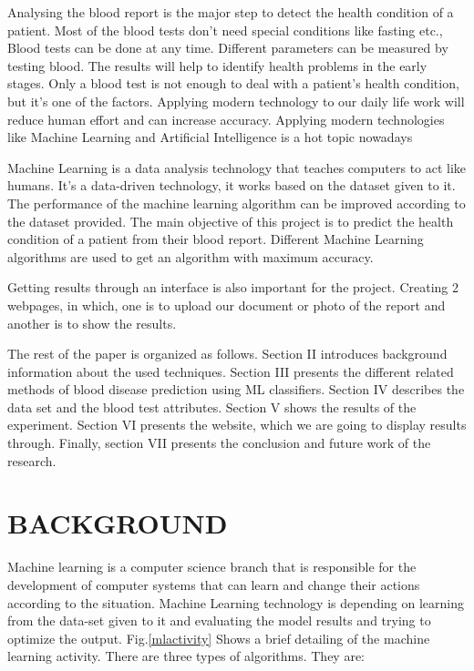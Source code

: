 \documentclass[twocolumn]{article}
\begin{document}
Analysing the blood report is the major step to detect the health condition of a patient. Most of the blood tests don’t need special conditions like fasting etc., Blood tests can be done at any time. Different parameters can be measured by testing blood. The results will help to identify health problems in the early stages. Only a blood test is not enough to deal with a patient’s health condition, but it’s one of the factors. Applying modern technology to our daily life work will reduce human effort and can increase accuracy. Applying modern technologies like Machine Learning and Artificial Intelligence is a hot topic nowadays

Machine Learning is a data analysis technology that teaches computers to act like humans. It’s a data-driven technology, it works based on the dataset given to it. The performance of the machine learning algorithm can be improved according to the dataset provided. The main objective of this project is to predict the health condition of a patient from their blood report. Different Machine Learning algorithms are used to get an algorithm with maximum accuracy. 

Getting results through an interface is also important for the project. Creating 2 webpages, in which, one is to upload our document or photo of the report and another is to show the results.

The rest of the paper is organized as follows. Section II introduces background information about the used techniques. Section III presents the different related methods of blood disease prediction using ML classifiers. Section IV describes the data set and the blood test attributes. Section V shows the results of the experiment. Section VI presents the website, which we are going to display results through. Finally, section VII presents the conclusion and future work of the research.

\section{BACKGROUND} 
Machine learning is a computer science branch that is responsible for the development of computer systems that can learn and change their actions according to the situation. Machine Learning technology is depending on learning from the data-set given to it and evaluating the model results and trying to optimize the output. Fig.\ref{mlactivity} Shows a brief detailing of the machine learning activity. There are three types of algorithms. They are: 
\end{document}
